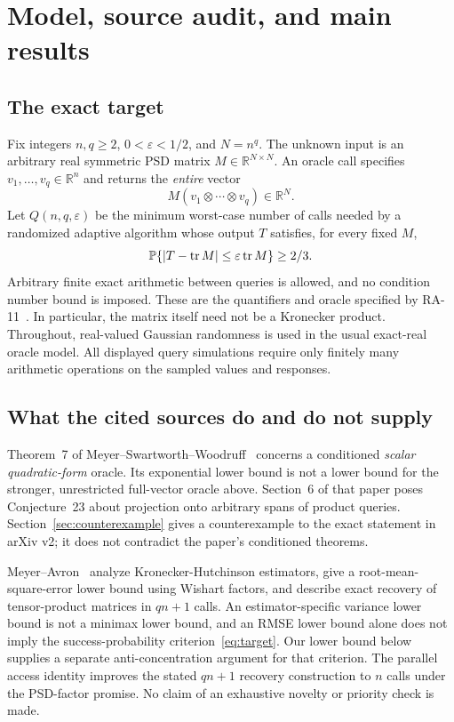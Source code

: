 \documentclass[11pt]{article}
\theoremstyle{definition}\newtheorem{definition}[theorem]{Definition}
\theoremstyle{remark}\newtheorem{remark}[theorem]{Remark}
\newcommand{\R}{\mathbb R}\newcommand{\C}{\mathbb C}
\newcommand{\tr}{\operatorname{tr}}\newcommand{\rank}{\operatorname{rank}}
\newcommand{\eps}{\varepsilon}\newcommand{\Qprod}{Q_{\mathrm{prod}}}
\begin{document}
\section{Model, source audit, and main results}
\label{sec:main}

\subsection{The exact target}
Fix integers $n,q\ge2$, $0<\eps<1/2$, and $N=n^q$.
The unknown input is an arbitrary real symmetric PSD matrix
$M\in\R^{N\times N}$. An oracle call specifies $v_1,\ldots,v_q\in\R^n$
and returns the \emph{entire} vector
\[
 M(v_1\otimes\cdots\otimes v_q)\in\R^N.
\]
Let $Q(n,q,\eps)$ be the minimum worst-case number of calls needed by a
randomized adaptive algorithm whose output $T$ satisfies, for every fixed $M$,
\begin{equation}\label{eq:target}
 \PP\{|T-\tr M|\le\eps\tr M\}\ge 2/3.
\end{equation}
Arbitrary finite exact arithmetic between queries is allowed, and no condition
number bound is imposed. These are the quantifiers and oracle specified by
RA-11~\cite{ra11}. In particular, the matrix itself need not be a Kronecker
product. Throughout, real-valued Gaussian randomness is used in the usual
exact-real oracle model. All displayed query simulations require only finitely
many arithmetic operations on the sampled values and responses.

\subsection{What the cited sources do and do not supply}
Theorem~7 of Meyer--Swartworth--Woodruff~\cite{msw} concerns a conditioned
\emph{scalar quadratic-form} oracle. Its exponential lower bound is not a lower
bound for the stronger, unrestricted full-vector oracle above. Section~6 of
that paper poses Conjecture~23 about projection onto arbitrary spans of product
queries. Section~\ref{sec:counterexample} gives a counterexample to the exact
statement in arXiv v2; it does not contradict the paper's conditioned theorems.

Meyer--Avron~\cite{ma} analyze Kronecker-Hutchinson estimators, give a
root-mean-square-error lower bound using Wishart factors, and describe exact
recovery of tensor-product matrices in $qn+1$ calls. An estimator-specific
variance lower bound is not a minimax lower bound, and an RMSE lower bound alone
does not imply the success-probability criterion~\eqref{eq:target}. Our lower
bound below supplies a separate anti-concentration argument for that criterion.
The parallel access identity improves the stated $qn+1$ recovery construction
to $n$ calls under the PSD-factor promise. No claim of an exhaustive novelty
or priority check is made.
\end{document}
